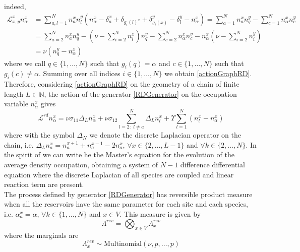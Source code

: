 \documentclass[11pt]{article}
\numberwithin{equation}{section}
\numberwithin{equation}{subsection}
\begin{document}
indeed, 
\begin{equation}
    \begin{split}
\mathcal{L}_{x,y}^{x}n_{\alpha}^{x}&=\sum_{a,l=1}^{N}n_{a}^{x}n_{l}^{y}\left(n_{\alpha}^{x}-\delta_{a}^{x}+\delta_{g_{i}(l)^{x}}+\delta_{g_{i}(x)}^{y}-\delta_{l}^{y}-n_{\alpha}^{x}\right)=\sum_{a=1}^{N}n_{a}^{x}n_{q}^{y}-\sum_{c=1}^{N}n_{\alpha}^{x}n_{c}^{y}
\\&=
\sum_{a=2}^{N}n_{a}^{x}n_{q}^{y}-\left(\nu-\sum_{i=2}^{N}n_{i}^{x}\right)n_{q}^{y}-\sum_{c=2}^{N}n_{\alpha}^{x}n_{c}^{y}-n_{\alpha}^{x}\left(\nu-\sum_{i=2}^{N}n_{i}^{y}\right)
\\&=
\nu(n_{q}^{y}-n_{\alpha}^{x})
    \end{split}
\end{equation}
where we call $q\in \{1,\ldots,N\}$ such that $g_{i}(q)=\alpha$ and $c\in \{1,\ldots,N\}$ such that $g_{i}(c)\neq \alpha$. Summing over all indices $i\in\{1,\ldots,N\}$ we obtain \eqref{actionGraphRD}.\\
Therefore, considering \eqref{actionGraphRD} on the geometry of a chain of finite length $L\in \mathbb{N}$, the action of the generator \eqref{RDGenerator} on the occupation variable $n_{\alpha}^{x}$ gives
\begin{equation}\label{DifferenceEquation}
\mathcal{L}^{rd}n_{\alpha}^{x}=\nu\sigma_{11}\Delta_{L}n_{\alpha}^{x}+\nu\sigma_{12}\sum_{l=2\,:\,l\neq a}^{N}\Delta_{L}n_{l}^{x}+\Upsilon\sum_{l=1}^{N}(n_{l}^{x}-n_{\alpha}^{x})
\end{equation}
where with the symbol $\Delta_{N}$ we denote the discrete Laplacian operator on the chain, i.e. $\Delta_{L}n_{a}^{x}=n_{a}^{x+1}+n_{a}^{x-1}-2n_{a}^{x}$, $\forall x\in \{2,\ldots,L-1\}$ and $\forall k\in \{2,\ldots,N\}$. In the spirit of \cite{casini2022uphill} we can write he the Master's equation for the evolution of the average density occupation, obtaining a system of $N-1$ difference differential equation where the discrete Laplacian of all species are coupled and linear reaction term are present. \\ 
The process defined by generator \eqref{RDGenerator} has reversible product measure when all the reservoirs have the same parameter for each site and each species, i.e. $\alpha_{a}^{x}=\alpha$, $\forall k\in \{1,\ldots,N\}$ and $x\in V$. This measure is given by
\begin{equation}
    \Lambda^{rev}=\bigotimes_{x\in V}\Lambda_{x}^{rev}
\end{equation}
where the marginals are
\begin{equation}
    \Lambda_{x}^{rev}\sim \text{Multinomial}(\nu,p,\ldots,p)
\end{equation}
\end{document}
